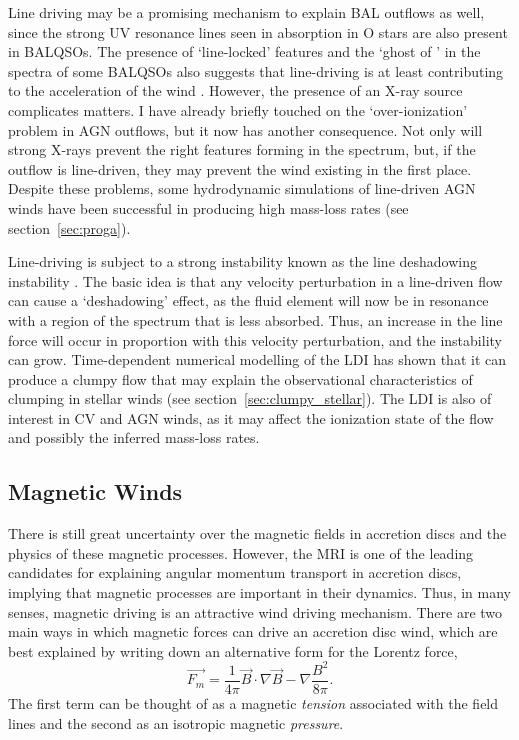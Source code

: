 Line driving may be a promising mechanism to explain BAL outflows as well, since
the strong UV resonance lines seen in absorption in O stars are also 
present in BALQSOs. The presence of `line-locked' features \citep{bowler2014} 
and the `ghost of \la' \citep{arav1995, arav1996, north2006}
in the spectra of some BALQSOs also suggests that line-driving is
at least contributing to the acceleration of the wind 
\citep[but see also][]{cottis2010}.
However, the presence of an X-ray source complicates matters.
I have already briefly touched on the `over-ionization' problem
in AGN outflows, but it now has another consequence. Not only will 
strong X-rays prevent the right features forming in the spectrum, but, if
the outflow is line-driven, they may prevent the wind existing in the first 
place. Despite these problems, some hydrodynamic simulations of line-driven AGN winds
have been successful in producing high mass-loss rates (see section~\ref{sec:proga}).

Line-driving is subject to a strong instability known
as the line deshadowing instability 
\citep[LDI;][]{lucysolomon1970,macgregor1979,owockirybicki1984,owockirybicki1985}.
The basic idea is that any velocity perturbation in a line-driven flow can cause a 
`deshadowing' effect, as the fluid element will now
be in resonance with a region of the spectrum that is less absorbed.
Thus, an increase in the line force will occur in proportion
with this velocity perturbation, and the instability can grow. 
Time-dependent numerical modelling of the LDI has shown that it can
produce a clumpy flow \citep{owocki1988,feldmeier1995,surlan2012,owocki2014}
that may explain the observational characteristics of clumping in 
stellar winds (see section~\ref{sec:clumpy_stellar}). 
The LDI is also of interest in CV and AGN winds, as it
may affect the ionization state of the flow and possibly the inferred
mass-loss rates.


\subsection{Magnetic Winds}
\label{sec:mag_winds}

There is still great uncertainty over the magnetic fields in accretion discs
and the physics of these magnetic processes. However, the MRI is one of the 
leading candidates for explaining angular momentum transport in accretion discs,
implying that magnetic processes are important in their dynamics. 
Thus, in many senses, magnetic driving is an attractive wind driving mechanism.
There are two main ways in which magnetic forces can drive an 
accretion disc wind, which are best explained by writing down an 
alternative form for the Lorentz force,
\begin{equation}
\vec{F_m} = \frac{1}{4\pi} \vec{B} \cdot \nabla \vec{B} - \nabla \frac{B^2}{8\pi}.
\end{equation}
The first term can be thought of as a magnetic {\em tension}
associated with the field lines and the second as an isotropic magnetic
{\em pressure}.

